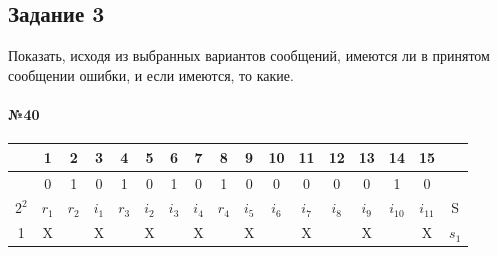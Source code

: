 \documentclass[12pt,onecolumn]{article}
\begin{document}
\begin{flushleft}
\subsection{Задание 3}
Показать, исходя из выбранных вариантов сообщений, имеются ли в принятом сообщении ошибки,
и если имеются, то какие.
\paragraph{№40}
\hfill \break
\FloatBarrier
\begin{table}[!h]
  \begin{tabular}{|c|c|c|c|c|c|c|c|c|c|c|c|c|c|c|c|c|}
  \hline
        & 1                         & 2                         & 3                         & 4                         & 5                         & 6                         & 7                         & 8                         & 9                         & 10                        & 11                        & 12                        & 13                        & 14                        & 15                        &       \\ \hline
        & 0                         & 1                         & 0                         & 1                         & 0                         & 1                         & 0                         & 1                         & 0                         & 0                         & 0                         & 0                         & 0                         & 1                         & 0                         &       \\ \hline
  $2^2$ & $r_1$                     & $r_2$                     & $i_1$                     & $r_3$                     & $i_2$                     & $i_3$                     & $i_4$                     & $r_4$                     & $i_5$                     & $i_6$                     & $i_7$                     & $i_8$                     & $i_9$                     & $i_{10}$                    & $i_{11}$                    & S     \\ \hline
  1     & \cellcolor[HTML]{32CB00}X &                           & \cellcolor[HTML]{32CB00}X &                           & \cellcolor[HTML]{32CB00}X &                           & \cellcolor[HTML]{32CB00}X &                           & \cellcolor[HTML]{32CB00}X &                           & \cellcolor[HTML]{32CB00}X &                           & \cellcolor[HTML]{32CB00}X &                           & \cellcolor[HTML]{32CB00}X & $s_1$ \\ \hline

\end{tabular}
\end{table}
\end{flushleft}
\end{document}
